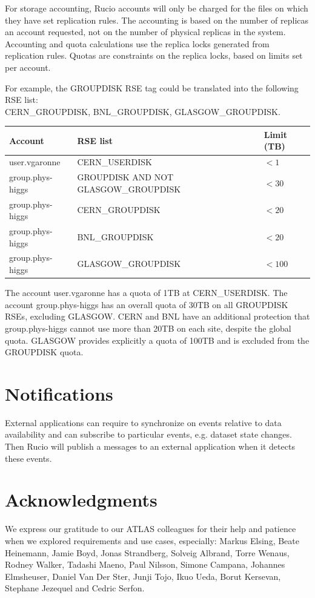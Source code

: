 \documentclass{atlasnote}
\begin{document}
For storage accounting, Rucio accounts will only be charged for the files on which they have set replication rules. The accounting is based on the number of replicas an account requested, not on the number of physical replicas in the system. Accounting and quota calculations use the replica locks generated from replication rules. Quotas are constraints on the replica locks, based on limits set per account.

For example, the GROUPDISK RSE tag could be translated into the following RSE list:\\CERN\_GROUPDISK, BNL\_GROUPDISK, GLASGOW\_GROUPDISK.

\bigskip

\begin{tabular}{l p{9cm} p{2cm}}
\toprule
\textbf{Account} & \textbf{RSE list} & \textbf{Limit (TB)} \\
\midrule
user.vgaronne & CERN\_USERDISK & $< 1$ \\
group.phys-higgs & GROUPDISK AND NOT GLASGOW\_GROUPDISK & $< 30$ \\
group.phys-higgs & CERN\_GROUPDISK & $< 20$ \\
group.phys-higgs & BNL\_GROUPDISK & $< 20$ \\
group.phys-higgs & GLASGOW\_GROUPDISK & $< 100$ \\
\bottomrule
\end{tabular}

\bigskip

\noindent The account user.vgaronne has a quota of 1TB at CERN\_USERDISK. The account group.phys-higgs has an overall quota of 30TB on all GROUPDISK RSEs, excluding GLASGOW. CERN and BNL have an additional protection that group.phys-higgs cannot use more than 20TB on each site, despite the global quota. GLASGOW provides explicitly a quota of 100TB and is excluded from the GROUPDISK quota.

\section{Notifications}
\label{overview_Notifications:notifications}

External applications can require to synchronize on events relative to data availability and can subscribe to particular events, e.g. dataset state changes. Then Rucio will publish a messages to an external application when it detects these events.

\section*{Acknowledgments}
\label{Acknowledgments:acknowledgments}
We express our gratitude to our ATLAS colleagues for their help and patience when we explored requirements and use cases, especially: Markus Elsing, Beate Heinemann, Jamie Boyd, Jonas Strandberg, Solveig Albrand, Torre Wenaus, Rodney Walker, Tadashi Maeno, Paul Nilsson, Simone Campana, Johannes Elmsheuser, Daniel Van Der Ster, Junji Tojo, Ikuo Ueda, Borut Kersevan, Stephane Jezequel and Cedric Serfon.
\end{document}
